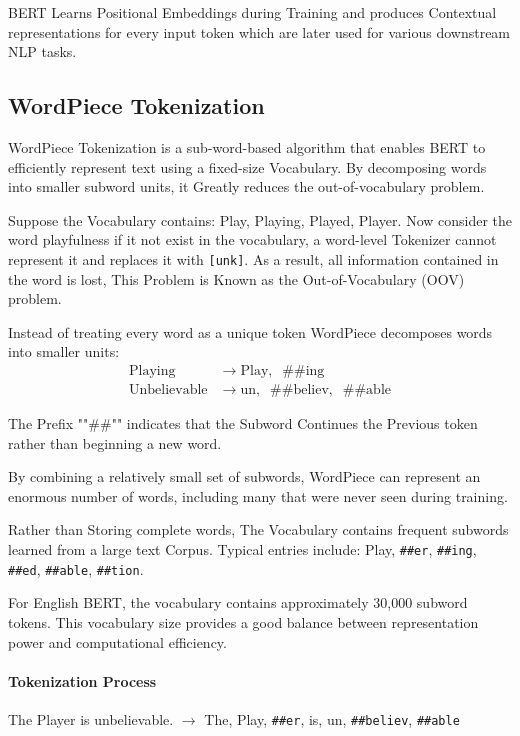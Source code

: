 BERT Learns Positional Embeddings during Training and produces Contextual representations for every input token which are later used for various downstream NLP tasks.

\subsection{WordPiece Tokenization}

WordPiece Tokenization is a sub-word-based algorithm that enables BERT to efficiently represent text using a fixed-size Vocabulary. By decomposing words into smaller subword units, it Greatly reduces the out-of-vocabulary problem.

Suppose the Vocabulary contains: Play, Playing, Played, Player. Now consider the word playfulness if it not exist in the vocabulary, a word-level Tokenizer cannot represent it and replaces it with \texttt{[unk]}. As a result, all information contained in the word is lost, This Problem is Known as the Out-of-Vocabulary (OOV) problem.

Instead of treating every word as a unique token WordPiece decomposes words into smaller units:
\begin{align*}
\text{Playing} &\longrightarrow \text{Play}, \;\; \text{\#\#ing} \\
\text{Unbelievable} &\longrightarrow \text{un}, \;\; \text{\#\#believ}, \;\; \text{\#\#able}
\end{align*}

The Prefix ""\#\#"" indicates that the Subword Continues the Previous token rather than beginning a new word.

By combining a relatively small set of subwords, WordPiece can represent an enormous number of words, including many that were never seen during training.

Rather than Storing complete words, The Vocabulary contains frequent subwords learned from a large text Corpus. Typical entries include: Play, \texttt{\#\#er}, \texttt{\#\#ing}, \texttt{\#\#ed}, \texttt{\#\#able}, \texttt{\#\#tion}.

For English BERT, the vocabulary contains approximately 30,000 subword tokens. This vocabulary size provides a good balance between representation power and computational efficiency.

\paragraph{Tokenization Process}
The Player is unbelievable. $\longrightarrow$ The, Play, \texttt{\#\#er}, is, un, \texttt{\#\#believ}, \texttt{\#\#able}

